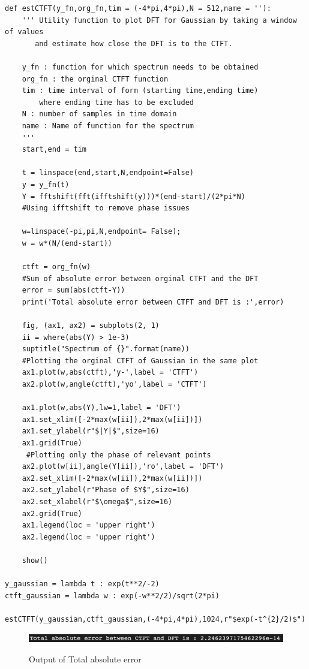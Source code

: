 \documentclass[11pt, a4paper]{article}
\begin{document}
\begin{verbatim}
def estCTFT(y_fn,org_fn,tim = (-4*pi,4*pi),N = 512,name = ''):
    ''' Utility function to plot DFT for Gaussian by taking a window of values
       and estimate how close the DFT is to the CTFT.

	y_fn : function for which spectrum needs to be obtained
	org_fn : the orginal CTFT function
	tim : time interval of form (starting time,ending time) 
		where ending time has to be excluded
	N : number of samples in time domain
	name : Name of function for the spectrum
	'''
    start,end = tim

    t = linspace(end,start,N,endpoint=False)
    y = y_fn(t)
    Y = fftshift(fft(ifftshift(y)))*(end-start)/(2*pi*N)  
    #Using ifftshift to remove phase issues

    w=linspace(-pi,pi,N,endpoint= False);
    w = w*(N/(end-start))
    
    ctft = org_fn(w)
    #Sum of absolute error between orginal CTFT and the DFT
    error = sum(abs(ctft-Y))
    print('Total absolute error between CTFT and DFT is :',error)
    
    fig, (ax1, ax2) = subplots(2, 1)
    ii = where(abs(Y) > 1e-3)
    suptitle("Spectrum of {}".format(name))
    #Plotting the orginal CTFT of Gaussian in the same plot
    ax1.plot(w,abs(ctft),'y-',label = 'CTFT')
    ax2.plot(w,angle(ctft),'yo',label = 'CTFT')

    ax1.plot(w,abs(Y),lw=1,label = 'DFT')
    ax1.set_xlim([-2*max(w[ii]),2*max(w[ii])])
    ax1.set_ylabel(r"$|Y|$",size=16)
    ax1.grid(True)
     #Plotting only the phase of relevant points
    ax2.plot(w[ii],angle(Y[ii]),'ro',label = 'DFT') 
    ax2.set_xlim([-2*max(w[ii]),2*max(w[ii])])  
    ax2.set_ylabel(r"Phase of $Y$",size=16)
    ax2.set_xlabel(r"$\omega$",size=16)
    ax2.grid(True)
    ax1.legend(loc = 'upper right')
    ax2.legend(loc = 'upper right')

    show()

y_gaussian = lambda t : exp(t**2/-2)
ctft_gaussian = lambda w : exp(-w**2/2)/sqrt(2*pi)

estCTFT(y_gaussian,ctft_gaussian,(-4*pi,4*pi),1024,r"$exp(-t^{2}/2)$")
\end{verbatim}
\begin{figure}[H]
   	\centering
   	\includegraphics[scale=0.5]{qn4.png}
   	\label{fig:qn4}
   	\caption{Output of Total absolute error}
\end{figure}
\end{document}
